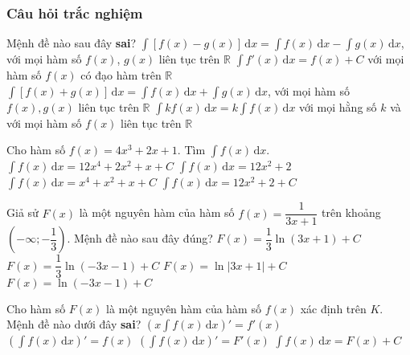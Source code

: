 \subsubsection{Câu hỏi trắc nghiệm}
\begin{ex}%
	Mệnh đề nào sau đây \textbf{sai}?
	\choice
	{$\displaystyle\int[f(x)-g(x)]\mathrm{\,d}x=\displaystyle\int f(x)\mathrm{\,d}x-\displaystyle\int g(x)\mathrm{\,d}x$, với mọi hàm số $f(x)$, $ g(x)$ liên tục trên $\mathbb{R}$}
	{$\displaystyle\int f'(x)\mathrm{\,d}x=f(x)+C$ với mọi hàm số $f(x)$ có đạo hàm trên $\mathbb{R}$}
	{$\displaystyle\int[f(x)+g(x)]\mathrm{\,d}x=\displaystyle\int f(x)\mathrm{\,d}x+\displaystyle\int g(x)\mathrm{\,d}x$, với mọi hàm số $f(x), g(x)$ liên tục trên $\mathbb{R}$}
	{\True $\displaystyle\int kf(x)\mathrm{\,d}x=k\displaystyle\int f(x)\mathrm{\,d}x$ với mọi hằng số $k$ và với mọi hàm số $f(x)$ liên tục trên $\mathbb{R}$}
\end{ex}
\begin{ex}%
	Cho hàm số $f(x)=4x^3+2x+1$. Tìm $\displaystyle\int f(x)\mathrm{\,d}x$. 
	\choice
	{$\displaystyle\int f(x)\mathrm{\,d}x=12x^4+2x^2+x+C$}
	{$\displaystyle\int f(x)\mathrm{\,d}x=12x^2+2$}
	{\True $\displaystyle\int f(x)\mathrm{\,d}x=x^4+x^2+x+C$}
	{$\displaystyle\int f(x)\mathrm{\,d}x=12x^2+2+C$}
\end{ex}
\begin{ex}%
	Giả sử $F(x)$ là một nguyên hàm của hàm số $f(x)=\dfrac{1}{3x+1}$ trên khoảng $\left(-\infty;-\dfrac{1}{3}\right)$. Mệnh đề nào sau đây đúng?
	\choice
	{$F(x)=\dfrac{1}{3}\ln (3x+1)+C$}
	{\True $F(x)=\dfrac{1}{3}\ln (-3x-1)+C$}
	{$F(x)=\ln |3x+1|+C$}
	{$F(x)=\ln (-3x-1)+C$}
\end{ex}
\begin{ex}%
	Cho hàm số $F(x)$ là một nguyên hàm của hàm số $f(x)$ xác định trên $K$. Mệnh đề nào dưới đây \textbf{sai}?
	\choice
	{\True $\left(x\displaystyle\int f(x)\mathrm{\,d}x\right)'=f'(x)$}
	{$\left(\displaystyle\int f(x)\mathrm{\,d}x\right)'=f(x)$}
	{$\left(\displaystyle\int f(x)\mathrm{\,d}x\right)'=F'(x)$}
	{$\displaystyle\int f(x)\mathrm{\,d}x=F(x)+C$}
\end{ex}

